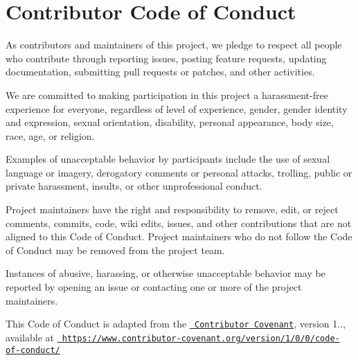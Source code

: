 \chapter{Contributor Code of Conduct}
\hypertarget{md__d_1_2_g_i_t_2_food_link_2foodlink_8client_2node__modules_2karma_2_c_o_d_e___o_f___c_o_n_d_u_c_t}{}\label{md__d_1_2_g_i_t_2_food_link_2foodlink_8client_2node__modules_2karma_2_c_o_d_e___o_f___c_o_n_d_u_c_t}
\label{md__d_1_2_g_i_t_2_food_link_2foodlink_8client_2node__modules_2karma_2_c_o_d_e___o_f___c_o_n_d_u_c_t_autotoc_md11820}%
%


As contributors and maintainers of this project, we pledge to respect all people who contribute through reporting issues, posting feature requests, updating documentation, submitting pull requests or patches, and other activities.

We are committed to making participation in this project a harassment-\/free experience for everyone, regardless of level of experience, gender, gender identity and expression, sexual orientation, disability, personal appearance, body size, race, age, or religion.

Examples of unacceptable behavior by participants include the use of sexual language or imagery, derogatory comments or personal attacks, trolling, public or private harassment, insults, or other unprofessional conduct.

Project maintainers have the right and responsibility to remove, edit, or reject comments, commits, code, wiki edits, issues, and other contributions that are not aligned to this Code of Conduct. Project maintainers who do not follow the Code of Conduct may be removed from the project team.

Instances of abusive, harassing, or otherwise unacceptable behavior may be reported by opening an issue or contacting one or more of the project maintainers.

This Code of Conduct is adapted from the \href{https://www.contributor-covenant.org/}{\texttt{ Contributor Covenant}}, version 1.., available at \href{https://www.contributor-covenant.org/version/1/0/0/code-of-conduct/}{\texttt{ https\+://www.\+contributor-\/covenant.\+org/version/1/0/0/code-\/of-\/conduct/}} 